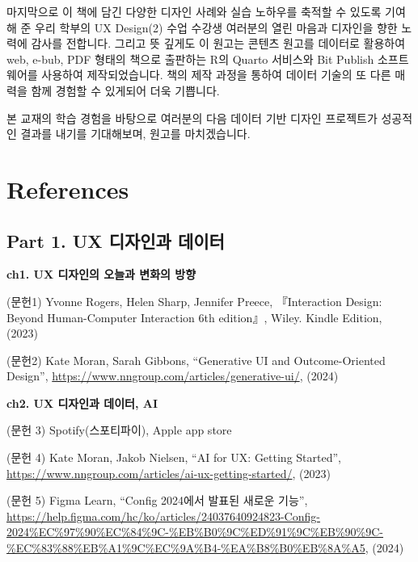 \documentclass[
  letterpaper,
]{book}
\begin{document}
마지막으로 이 책에 담긴 다양한 디자인 사례와 실습 노하우를 축적할 수
있도록 기여해 준 우리 학부의 UX Design(2) 수업 수강생 여러분의 열린
마음과 디자인을 향한 노력에 감사를 전합니다. 그리고 뜻 깊게도 이 원고는
콘텐츠 원고를 데이터로 활용하여 web, e-bub, PDF 형태의 책으로 출판하는
R의 Quarto 서비스와 Bit Publish 소프트웨어를 사용하여 제작되었습니다.
책의 제작 과정을 통하여 데이터 기술의 또 다른 매력을 함께 경험할 수
있게되어 더욱 기쁩니다.

본 교재의 학습 경험을 바탕으로 여러분의 다음 데이터 기반 디자인
프로젝트가 성공적인 결과를 내기를 기대해보며, 원고를 마치겠습니다.


\chapter*{References}\label{references}


\section*{Part 1. UX 디자인과
데이터}\label{part-1.-ux-uxb514uxc790uxc778uxacfc-uxb370uxc774uxd130-2}


\textbf{ch1. UX 디자인의 오늘과 변화의 방향}

(문헌1) Yvonne Rogers, Helen Sharp, Jennifer Preece, 『Interaction
Design: Beyond Human-Computer Interaction 6th edition』, Wiley. Kindle
Edition, (2023)

(문헌2) Kate Moran, Sarah Gibbons, ``Generative UI and Outcome-Oriented
Design'', \url{https://www.nngroup.com/articles/generative-ui/}, (2024)

\textbf{ch2. UX 디자인과 데이터, AI}

(문헌 3) Spotify(스포티파이), Apple app store

(문헌 4) Kate Moran, Jakob Nielsen, ``AI for UX: Getting Started'',
\url{https://www.nngroup.com/articles/ai-ux-getting-started/}, (2023)

(문헌 5) Figma Learn, ``Config 2024에서 발표된 새로운 기능'',
\url{https://help.figma.com/hc/ko/articles/24037640924823-Config-2024\%EC\%97\%90\%EC\%84\%9C-\%EB\%B0\%9C\%ED\%91\%9C\%EB\%90\%9C-\%EC\%83\%88\%EB\%A1\%9C\%EC\%9A\%B4-\%EA\%B8\%B0\%EB\%8A\%A5},
(2024)
\end{document}
